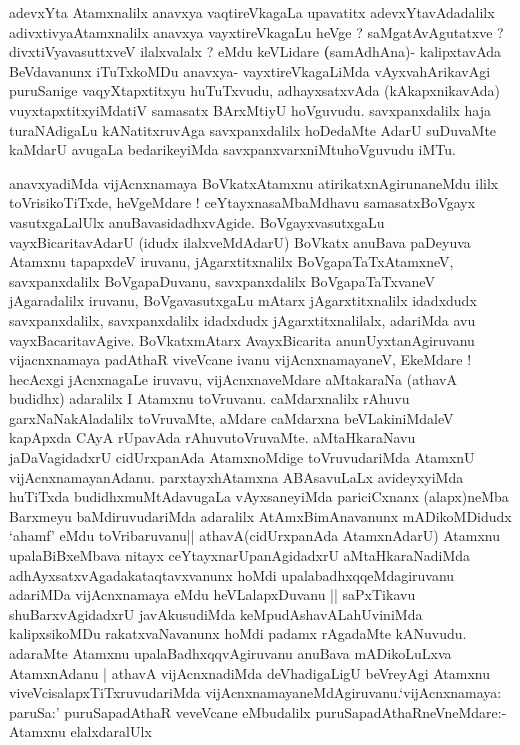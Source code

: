 \begin{artha}
adevxYta Atamxnalilx anavxya vaqtireVkagaLa upavatitx
adevxYtavAdadalilx adivxtivyaAtamxnalilx anavxya vayxtireVkagaLu heVge
? saMgatAvAgutatxve ? divxtiVyavasuttxveV ilalxvalalx ? eMdu keVLidare
\textbf(samAdhAna)- kalipxtavAda BeVdavanunx iTuTxkoMDu anavxya-
vayxtireVkagaLiMda vAyxvahArikavAgi puruSanige vaqyXtapxtitxyu
huTuTxvudu, adhayxsatxvAda (kAkapxnikavAda) vuyxtapxtitxyiMdatiV
samasatx BArxMtiyU hoVguvudu. savxpanxdalilx haja turaNAdigaLu
kANatitxruvAga savxpanxdalilx hoDedaMte AdarU suDuvaMte kaMdarU
avugaLa bedarikeyiMda savxpanxvarxniMtuhoVguvudu iMTu.
\end{artha}

\begin{artha}
anavxyadiMda vijAcnxnamaya BoVkatxAtamxnu atirikatxnAgirunaneMdu ililx
toVrisikoTiTxde, heVgeMdare ! ceYtayxnasaMbaMdhavu samasatxBoVgayx
vasutxgaLalUlx anuBavasidadhxvAgide. BoVgayxvasutxgaLu
vayxBicaritavAdarU (idudx ilalxveMdAdarU) BoVkatx anuBava paDeyuva
Atamxnu tapapxdeV iruvanu, jAgarxtitxnalilx BoVgapaTaTxAtamxneV,
savxpanxdalilx BoVgapaDuvanu, savxpanxdalilx BoVgapaTaTxvaneV
jAgaradalilx iruvanu, BoVgavasutxgaLu mAtarx jAgarxtitxnalilx
idadxdudx savxpanxdalilx, savxpanxdalilx idadxdudx jAgarxtitxnalilalx,
adariMda avu vayxBacaritavAgive. BoVkatxmAtarx AvayxBicarita
anunUyxtanAgiruvanu vijacnxnamaya padAthaR viveVcane ivanu
vijAcnxnamayaneV, EkeMdare ! hecAcxgi jAcnxnagaLe iruvavu,
vijAcnxnaveMdare aMtakaraNa (athavA budidhx) adaralilx I Atamxnu
toVruvanu. caMdarxnalilx rAhuvu garxNaNakAladalilx toVruvaMte, aMdare
caMdarxna beVLakiniMdaleV kapApxda CAyA rUpavAda
rAhuvutoVruvaMte. aMtaHkaraNavu jaDaVagidadxrU cidUrxpanAda
AtamxnoMdige toVruvudariMda AtamxnU
vijAcnxnamayanAdanu. parxtayxhAtamxna ABAsavuLaLx avideyxyiMda
huTiTxda budidhxmuMtAdavugaLa vAyxsaneyiMda pariciCxnanx (alapx)neMba
Barxmeyu baMdiruvudariMda adaralilx AtAmxBimAnavanunx mADikoMDidudx
`ahamf' eMdu toVribaruvanu|| athavA(cidUrxpanAda AtamxnAdarU) Atamxnu
upalaBiBxeMbava nitayx ceYtayxnarUpanAgidadxrU aMtaHkaraNadiMda
adhAyxsatxvAgadakataqtavxvanunx hoMdi upalabadhxqqeMdagiruvanu
adariMDa vijAcnxnamaya eMdu heVLalapxDuvanu || saPxTikavu
shuBarxvAgidadxrU javAkusudiMda keMpudAshavALahUviniMda kalipxsikoMDu
rakatxvaNavanunx hoMdi padamx rAgadaMte kANuvudu. adaraMte Atamxnu
upalaBadhxqqvAgiruvanu anuBava mADikoLuLxva AtamxnAdanu | athavA
vijAcnxnadiMda deVhadigaLigU beVreyAgi Atamxnu
viveVcisalapxTiTxruvudariMda
vijAcnxnamayaneMdAgiruvanu.`vijAcnxnamaya: paruSa:' puruSapadAthaR
veveVcane eMbudalilx puruSapadAthaRneVneMdare:- Atamxnu elalxdaralUlx

\end{artha}
